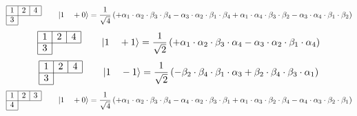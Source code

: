 \documentclass[fleqn]{article}%
\begin{document}
\vspace{0.25cm}%
\begin{dmath*}\begin{array}{|c|c|c|} \hline 1 & 2 & 4\\ \cline{1-3} 3\\ \cline{1-1} \end{array} \qquad \ket{ 1 \quad  +0 } = \frac{1}{\sqrt{4}} \left( + \alpha_{1} \cdot \alpha_{2} \cdot \beta_{3} \cdot \beta_{4}  - \alpha_{3} \cdot \alpha_{2} \cdot \beta_{1} \cdot \beta_{4}  + \alpha_{1} \cdot \alpha_{4} \cdot \beta_{3} \cdot \beta_{2}  - \alpha_{3} \cdot \alpha_{4} \cdot \beta_{1} \cdot \beta_{2}\right) \end{dmath*}%
\vspace{0.25cm}%
\begin{dmath*}\begin{array}{|c|c|c|} \hline 1 & 2 & 4\\ \cline{1-3} 3\\ \cline{1-1} \end{array} \qquad \ket{ 1 \quad  +1 } = \frac{1}{\sqrt{2}} \left( + \alpha_{1} \cdot \alpha_{2} \cdot \beta_{3} \cdot \alpha_{4}  - \alpha_{3} \cdot \alpha_{2} \cdot \beta_{1} \cdot \alpha_{4}\right) \end{dmath*}%
\vspace{0.25cm}%
\begin{dmath*}\begin{array}{|c|c|c|} \hline 1 & 2 & 4\\ \cline{1-3} 3\\ \cline{1-1} \end{array} \qquad \ket{ 1 \quad  -1 } = \frac{1}{\sqrt{2}} \left( - \beta_{2} \cdot \beta_{4} \cdot \beta_{1} \cdot \alpha_{3}  + \beta_{2} \cdot \beta_{4} \cdot \beta_{3} \cdot \alpha_{1}\right) \end{dmath*}%
\vspace{0.25cm}%
\begin{dmath*}\begin{array}{|c|c|c|} \hline 1 & 2 & 3\\ \cline{1-3} 4\\ \cline{1-1} \end{array} \qquad \ket{ 1 \quad  +0 } = \frac{1}{\sqrt{4}} \left( + \alpha_{1} \cdot \alpha_{2} \cdot \beta_{3} \cdot \beta_{4}  - \alpha_{4} \cdot \alpha_{2} \cdot \beta_{3} \cdot \beta_{1}  + \alpha_{1} \cdot \alpha_{3} \cdot \beta_{2} \cdot \beta_{4}  - \alpha_{4} \cdot \alpha_{3} \cdot \beta_{2} \cdot \beta_{1}\right) \end{dmath*}%
\end{document}
